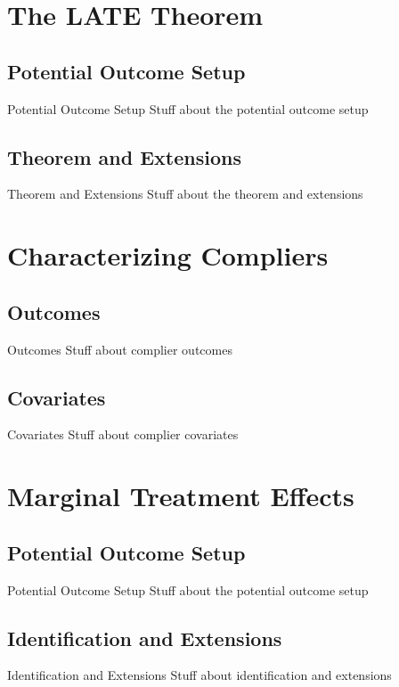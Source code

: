 \documentclass{beamer}
\begin{document}

\section{The LATE Theorem}

\subsection{Potential Outcome Setup}
\begin{frame}{Potential Outcome Setup}
Stuff about the potential outcome setup
\end{frame}

\subsection{Theorem and Extensions}
\begin{frame}{Theorem and Extensions}
Stuff about the theorem and extensions
\end{frame}

\section{Characterizing Compliers}

\subsection{Outcomes}
\begin{frame}{Outcomes}
Stuff about complier outcomes
\end{frame}

\subsection{Covariates}
\begin{frame}{Covariates}
Stuff about complier covariates
\end{frame}

\section{Marginal Treatment Effects}

\subsection{Potential Outcome Setup}
\begin{frame}{Potential Outcome Setup}
Stuff about the potential outcome setup
\end{frame}

\subsection{Identification and Extensions}
\begin{frame}{Identification and Extensions}
Stuff about identification and extensions
\end{frame}
\end{document}
